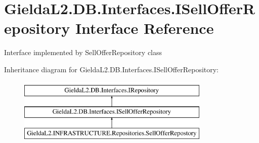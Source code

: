 \hypertarget{interface_gielda_l2_1_1_d_b_1_1_interfaces_1_1_i_sell_offer_repository}{}\section{Gielda\+L2.\+D\+B.\+Interfaces.\+I\+Sell\+Offer\+Repository Interface Reference}
\label{interface_gielda_l2_1_1_d_b_1_1_interfaces_1_1_i_sell_offer_repository}


Interface implemented by Sell\+Offer\+Repository class  


Inheritance diagram for Gielda\+L2.\+D\+B.\+Interfaces.\+I\+Sell\+Offer\+Repository\+:\begin{figure}[H]
\begin{center}
\leavevmode
\includegraphics[height=3.000000cm]{interface_gielda_l2_1_1_d_b_1_1_interfaces_1_1_i_sell_offer_repository}
\end{center}
\end{figure}
